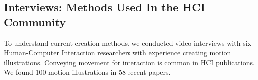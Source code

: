 





\subsection{Interviews: Methods Used In the HCI Community}
To understand current creation methods, we conducted video interviews with six Human-Computer Interaction researchers with experience creating motion illustrations.
%
Conveying movement for interaction is common in HCI publications. We found 100 motion illustrations in 58 recent papers.


%

